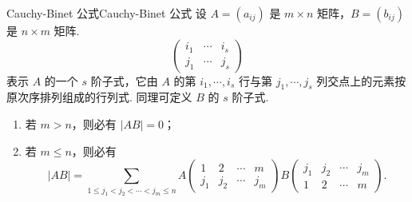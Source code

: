 \begin{theorem}{Cauchy-Binet 公式}{Cauchy-Binet 公式}
    设 $A = (a_{ij})$ 是 $m \times n$ 矩阵，$B = (b_{ij})$ 是 $n \times m$ 矩阵.
    \[
    \begin{pmatrix}
    i_1 & \cdots & i_s \\
    j_1 & \cdots & j_s
    \end{pmatrix}
    \]
    表示 $A$ 的一个 $s$ 阶子式，它由 $A$ 的第 $i_1, \cdots, i_s$ 行与第 $j_1, \cdots, j_s$ 列交点上的元素按原次序排列组成的行列式. 同理可定义 $B$ 的 $s$ 阶子式.
    \begin{enumerate}
        \item 若 $m > n$，则必有 $|AB| = 0$；
        \item 若 $m \leqslant n$，则必有
        \[
        |AB| = \sum_{1 \leqslant j_1 < j_2 < \cdots < j_m \leqslant n} A
        \begin{pmatrix}
        1 & 2 & \cdots & m \\
        j_1 & j_2 & \cdots & j_m
        \end{pmatrix}
        B
        \begin{pmatrix}
        j_1 & j_2 & \cdots & j_m \\
        1 & 2 & \cdots & m
        \end{pmatrix}.
        \]
    \end{enumerate}
\end{theorem}

